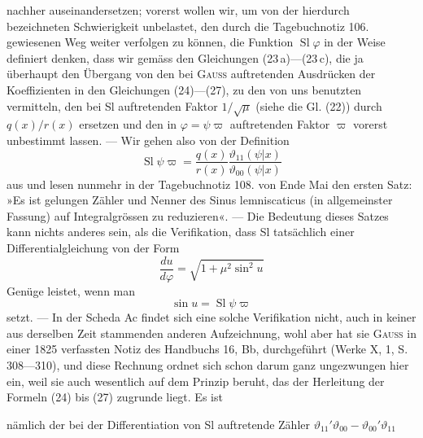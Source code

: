 nachher auseinandersetzen; vorerst wollen wir, um von der hierdurch bezeichneten Schwierigkeit unbelastet, den durch die Tagebuchnotiz 106. gewiesenen
Weg weiter verfolgen zu können, die Funktion \(\operatorname{Sl}\varphi\) in der Weise definiert
denken, dass wir gemäss den Gleichungen (23\,a)—(23\,c), die ja überhaupt den
Übergang von den bei \textsc{Gauss} auftretenden Ausdrücken der Koeffizienten in
den Gleichungen (24)—(27), zu den von uns benutzten vermitteln, den bei
Sl auftretenden Faktor \(1/\sqrt\mu\) (siehe die Gl. (22)) durch \(q(x)/r(x)\) ersetzen und
den in \(\varphi=\psi\varpi\) auftretenden Faktor \(\varpi\) vorerst unbestimmt lassen. — Wir
gehen also von der Definition
\begingroup\makeatletter\tagsleft@true\let\veqno\leqno\makeatother
\begin{equation*}
\operatorname{Sl}\psi\varpi=\frac{q(x)}{r(x)}\frac{\vartheta_{11}(\psi|x)}{\vartheta_{00}(\psi|x)}\tag{31}
\end{equation*}
\endgroup
\noindent aus und lesen nunmehr in der Tagebuchnotiz 108. von Ende Mai den ersten
Satz: »Es ist gelungen Zähler und Nenner des Sinus lemniscaticus (in allgemeinster Fassung) auf Integralgrössen zu reduzieren«. — Die Bedeutung dieses
Satzes kann nichts anderes sein, als die Verifikation, dass Sl tatsächlich einer
Differentialgleichung von der Form
\begingroup\makeatletter\tagsleft@true\let\veqno\leqno\makeatother
\begin{equation*}
\frac{du}{d\varphi}=\sqrt{1+\mu^2\sin^2u}\tag{32}
\end{equation*}
\endgroup
\noindent Genüge leistet, wenn man
\begingroup\makeatletter\tagsleft@true\let\veqno\leqno\makeatother
\begin{equation*}
\sin u=\operatorname{Sl}\psi\varpi\tag{31\,a}
\end{equation*}
\endgroup
\noindent setzt. — In der Scheda Ac findet sich eine solche Verifikation nicht, auch
in keiner aus derselben Zeit stammenden anderen Aufzeichnung, wohl aber
hat sie \textsc{Gauss} in einer 1825 verfassten Notiz des Handbuchs 16, Bb, durchgeführt (Werke X, 1, S. 308—310), und diese Rechnung ordnet sich schon
darum ganz ungezwungen hier ein, weil sie auch wesentlich auf dem Prinzip
beruht, das der Herleitung der Formeln (24) bis (27) zugrunde liegt. Es ist\par
\clearpage{}
\noindent nämlich der bei der Differentiation von Sl auftretende Zähler \(\vartheta_{11}'\vartheta_{00}-\vartheta_{00}'\vartheta_{11}\)
